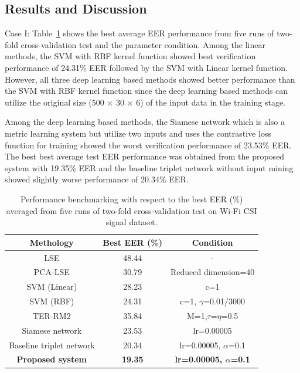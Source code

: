 \documentclass[runningheads]{llncs}
\begin{document}
\subsection{Results and Discussion}

Case I: Table~\ref{tab3} shows the best average EER performance from five runs of two-fold cross-validation test and the parameter condition. Among the linear methods, the SVM with RBF kernel function showed best verification performance of 24.31\% EER followed by the SVM with Linear kernel function. However, all three deep learning based methods showed better performance than the SVM with RBF kernel function since the deep learning based methods can utilize the original size (500 $\times$ 30 $\times$ 6) of the input data in the training stage.

Among the deep learning based methods, the Siamese network which is also a metric learning system but utilize two inputs and uses the contrastive loss function for training showed the worst verification performance of 23.53\% EER. The best best average test EER performance was obtained from the proposed system with 19.35\% EER and the baseline triplet network without input mining showed slightly worse performance of 20.34\% EER.

\begin{table}[!h]
    \caption{Performance benchmarking with respect to the best EER (\%) averaged from five runs of two-fold cross-validation test on Wi-Fi CSI signal dataset.}\label{tab3}
    \centering
    \begin{tabular}{|c|c|c|}
    \hline
    Methology   &   Best EER (\%) &   Condition   \\  \hline
    LSE &   48.44   &  - \\ 
    PCA-LSE    &   30.79   &  Reduced dimension=40    \\
    SVM (Linear) &   28.23   &   c=1 \\
    SVM (RBF)    &   24.31   &   c=1, $\gamma$=0.01/3000 \\
    TER-RM2 &   35.84   &  M=1,$\tau$=$\eta$=0.5   \\     \hline
    Siamese network  &   23.53   &   lr=0.00005  \\
    Baseline triplet network &   20.34   &   lr=0.00005, $\alpha$=0.1  \\
    \textbf{Proposed system} &   \textbf{19.35}   &  \textbf{lr=0.00005, $\alpha$=0.1}  \\
     \hline
    \end{tabular}
\end{table}
\end{document}
